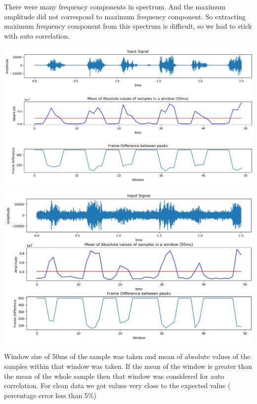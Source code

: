\documentclass[BTech]{nitkdiss}
\begin{document}
\hspace{0.4cm} There were many frequency components in spectrum. And the maximum amplitude did not correspond to maximum frequency component. So extracting maximum frequency component from this spectrum is difficult, so we had to stick with auto correlation.

\begin{center}
\includegraphics[scale = 0.38]{clean_auto.png}
\end{center}



\begin{center}
\includegraphics[scale = 0.38]{noisy_auto.png}
\end{center}

\hspace{0.4cm} Window size of 50ms of the sample was taken and mean of absolute values of the samples within that window was taken. If the mean of the window is greater than the mean of the whole sample then that window was considered for auto correlation. For clean data we got values very close to the expected value ( percentage error less than 5\%)
\end{document}
